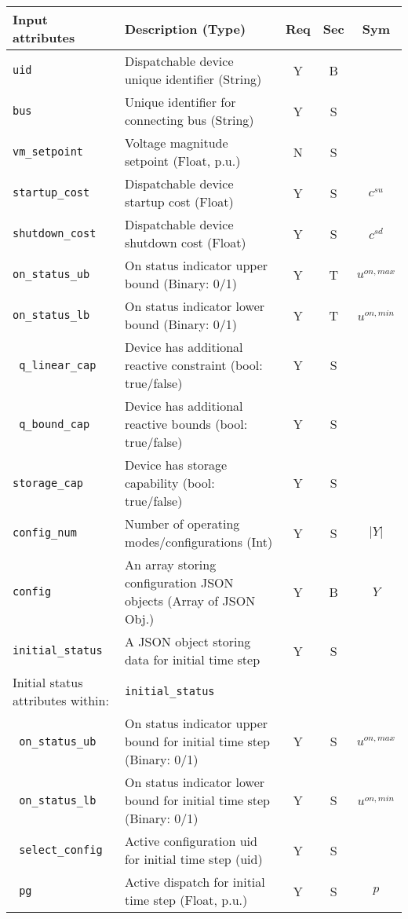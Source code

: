 \documentclass{article}
\begin{document}
\begin{center}
\small
\begin{tabular}{ l | l | c | c | c |}
Input attributes & Description (Type) & Req & Sec & Sym\\
\hline
  {\tt uid} & Dispatchable device unique identifier (String) & Y & B &  \\
  {\tt bus} & Unique identifier for connecting bus (String)& Y & S & \\
  {\tt vm\_setpoint} & Voltage magnitude setpoint (Float, p.u.) & N & S & \\
  {\tt startup\_cost} & Dispatchable device startup cost (Float) & Y & S & $c^{su}$\\
  {\tt shutdown\_cost} & Dispatchable device shutdown cost (Float) & Y & S & $c^{sd}$\\  
  {\tt on\_status\_ub} & On status indicator upper bound (Binary: 0/1) & Y & T & $u^{on,max}$\\
  {\tt on\_status\_lb} & On status indicator lower bound (Binary: 0/1) & Y & T & $u^{on,min}$\\
  {\tt\color{red} q\_linear\_cap}      & Device has additional reactive constraint (bool: true/false) & Y & S & \\
  {\tt\color{red} q\_bound\_cap}       & Device has additional reactive bounds (bool: true/false) & Y & S & \\
  {\tt storage\_cap}       & Device has storage capability (bool: true/false) & Y & S & \\
  {\tt config\_num} & Number of operating modes/configurations (Int) & Y & S & $\lvert Y \rvert$ \\
  {\tt config} & An array storing configuration JSON objects (Array of JSON Obj.) & Y & B & $Y$ \\
  {\tt initial\_status} & A JSON object storing data for initial time step & Y & S &  \\
  \hline \hline
  Initial status attributes within: &  {\tt initial\_status} &  &  & \\
  \hline    
  {\tt\color{red} on\_status\_ub} & On status indicator upper bound for initial time step (Binary: 0/1) & Y & S & $u^{on,max}$\\
  {\tt\color{red} on\_status\_lb} & On status indicator lower bound for initial time step (Binary: 0/1) & Y & S & $u^{on,min}$\\
  {\tt\color{red} select\_config}  & Active configuration uid for initial time step (uid) & Y & S & \\
  {\tt\color{red} pg} & Active dispatch for initial time step (Float, p.u.) & Y & S & $p$ \\

\end{tabular}
\end{center}
\end{document}
